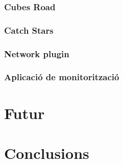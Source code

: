 \documentclass[12pt,a4paper,catalan]{article}
\begin{document}
	\subsubsection{Cubes Road}
	\subsubsection{Catch Stars}
	\subsubsection{Network plugin}
	\subsubsection{Aplicació de monitorització}
	\section{Futur}
	\section{Conclusions}
	\printbibliography[heading=bibnumbered,title={Referències}]
\end{document}
